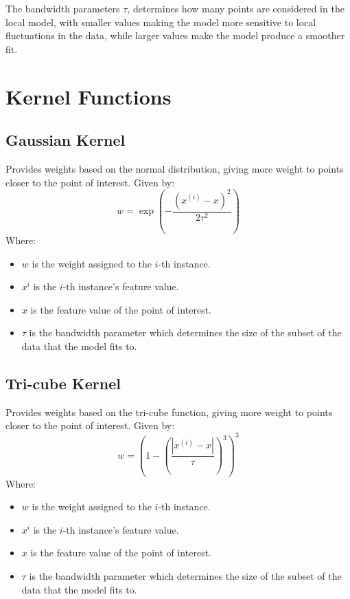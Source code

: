 \documentclass[12pt letter]{report}
\begin{document}
The bandwidth parameters $\tau$, determines how many points are considered in the local model, with smaller values
making the model more sensitive to local fluctuations in the data, while larger values make the model produce a smoother
fit.

\section{Kernel Functions}


\subsection{Gaussian Kernel}

Provides weights based on the normal distribution, giving more weight to points closer to the point of interest. Given by:
\[
  w = \exp \left( - \frac{\left( x^{(i)} - x \right)^2}{2\tau^2} \right)
\]
Where:
\begin{itemize}
  \item $w$ is the weight assigned to the $i$-th instance.
  \item $x^{i}$ is the $i$-th instance's feature value.
  \item  $x$ is the feature value of the point of interest.
  \item $\tau$ is the bandwidth parameter which determines the size of the subset of the data that the model fits to.
\end{itemize}

\subsection{Tri-cube Kernel}

Provides weights based on the tri-cube function, giving more weight to points closer to the point of interest. Given by:
\[
  w = \left( 1 - \left( \frac{\left| x^{(i)} - x \right|}{\tau} \right)^3 \right)^3
\]
Where:
\begin{itemize}
  \item $w$ is the weight assigned to the $i$-th instance.
  \item $x^{i}$ is the $i$-th instance's feature value.
  \item $x$ is the feature value of the point of interest.
  \item  $\tau$ is the bandwidth parameter which determines the size of the subset of the data that the model fits to.
\end{itemize}
\end{document}
